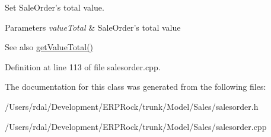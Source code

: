 \-Set \-Sale\-Order's total value. 


\begin{DoxyParams}{\-Parameters}
{\em value\-Total} & \-Sale\-Order's total value \\
\hline
\end{DoxyParams}
\begin{DoxySeeAlso}{\-See also}
\hyperlink{class_sales_order_ac3ccc93985ddbd4c2bab0fbac84aee18}{get\-Value\-Total()} 
\end{DoxySeeAlso}


\-Definition at line 113 of file salesorder.\-cpp.



\-The documentation for this class was generated from the following files\-:\begin{DoxyCompactItemize}
\item 
/\-Users/rdal/\-Development/\-E\-R\-P\-Rock/trunk/\-Model/\-Sales/salesorder.\-h\item 
/\-Users/rdal/\-Development/\-E\-R\-P\-Rock/trunk/\-Model/\-Sales/salesorder.\-cpp\end{DoxyCompactItemize}
